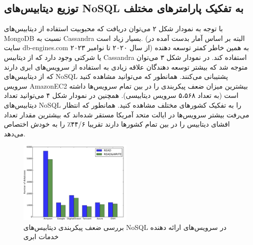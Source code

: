 \documentclass[10pt, a4paper]{article}
\begin{document}
\subsection{توزیع دیتابیس‌های NoSQL به تفکیک پارامتر‌های مختلف}

\begin{LTR}
    \begin{table}[h]
        \centering
        \begin{RTL}
            \caption{تعداد سرویس‌های افشا شده NoSQL}
        \end{RTL}
    \end{table}
\end{LTR}

با توجه به نمودار شکل ۲ می‌توان دریافت که محبوبیت استفاده از دیتابیس‌های MongoDB
نسبت به Cassandra بسیار زیاد است. (البته بر اساس آمار بدست آمده در سایت
db-engines.com از سال ۲۰۲۰ تا نوامبر ۲۰۲۳) به همین خاطر کمتر توسعه دهنده یا
شرکتی وجود دارد که از دیتابیس Cassandra استفاده کند. در نمودار شکل ۳ می‌توان
متوجه شد که بیشتر توسعه دهندگان علاقه زیادی به استفاده از سرویس‌های ابری دارند
که از دیتابیس‌های NoSQL پشتیبانی می‌کنند. همانطور که می‌توانید مشاهده کنید سرویس
AmazonEC2 بیشترین میزان ضعف پیکربندی را در بین تمام سرویس‌ها داشته است (به تعداد
۵،۵۶۸ سرویس دیتابیسی). همچنین در نمودار شکل ۴ می‌توانید تعداد دیتابیس‌های NoSQL
را به تفکیک کشور‌های مختلف مشاهده کنید. همانطور که انتظار می‌رفت بیشتر سرویس‌ها
در ایالت متحد آمریکا مستقر شده‌اند  که بیشترین مقدار تعداد افشای دیتابیس را در
بین تمام کشور‌ها دارند تقریبا ۴۴/۶٪ را به خودش اختصاص می‌دهد.

\begin{figure}
    \centering
    \includegraphics[width=0.5\textwidth]{res/b.png}
    \caption{بررسی ضعف پیکربندی دیتابیس‌های NoSQL در سرویس‌های ارائه دهنده خدمات ابری}
    \label{fig: diagram}
\end{figure}
\end{document}
